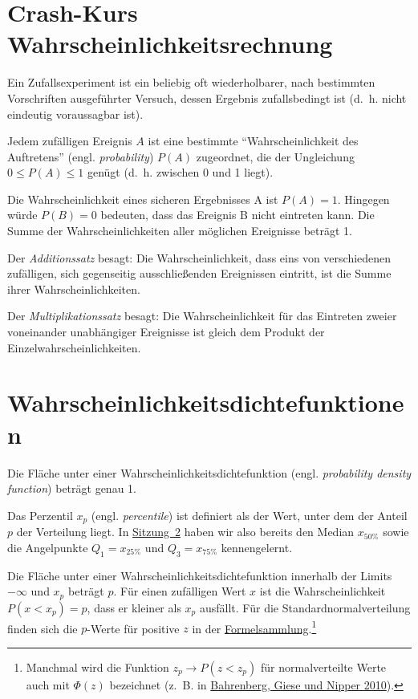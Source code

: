 \documentclass[
  11pt,
  ngerman,
  a4paper,
]{report}
\begin{document}
\hypertarget{crash-kurs-wahrscheinlichkeitsrechnung}{%
\section{Crash-Kurs Wahrscheinlichkeitsrechnung}\label{crash-kurs-wahrscheinlichkeitsrechnung}}

Ein Zufallsexperiment ist ein beliebig oft wiederholbarer, nach bestimmten Vorschriften ausgeführter Versuch, dessen Ergebnis zufallsbedingt ist (d.~h. nicht eindeutig voraussagbar ist).

Jedem zufälligen Ereignis \(A\) ist eine bestimmte \enquote{Wahrscheinlichkeit des Auftretens} (engl. \emph{probability}) \(P(A)\) zugeordnet, die der Ungleichung \(0 \leq P(A) \leq 1\) genügt (d.~h. zwischen 0 und 1 liegt).

Die Wahrscheinlichkeit eines sicheren Ergebnisses A ist \(P(A) = 1\). Hingegen würde \(P(B) = 0\) bedeuten, dass das Ereignis B nicht eintreten kann. Die Summe der Wahrscheinlichkeiten aller möglichen Ereignisse beträgt 1.

Der \emph{Additionssatz} besagt: Die Wahrscheinlichkeit, dass eins von verschiedenen zufälligen, sich gegenseitig ausschließenden Ereignissen eintritt, ist die Summe ihrer Wahrscheinlichkeiten.

Der \emph{Multiplikationssatz} besagt: Die Wahrscheinlichkeit für das Eintreten zweier voneinander unabhängiger Ereignisse ist gleich dem Produkt der Einzelwahrscheinlichkeiten.

\hypertarget{wahrscheinlichkeitsdichtefunktionen}{%
\section{Wahrscheinlichkeitsdichtefunktionen}\label{wahrscheinlichkeitsdichtefunktionen}}

Die Fläche unter einer Wahrscheinlichkeitsdichtefunktion (engl. \emph{probability density function}) beträgt genau 1.

Das Perzentil \(x_p\) (engl. \emph{percentile}) ist definiert als der Wert, unter dem der Anteil \(p\) der Verteilung liegt. In \protect\hyperlink{Mauxdfzahlen}{Sitzung~2} haben wir also bereits den Median \(x_{50\%}\) sowie die Angelpunkte \(Q_1=x_{25\%}\) und \(Q_3=x_{75\%}\) kennengelernt.

Die Fläche unter einer Wahrscheinlichkeitsdichtefunktion innerhalb der Limits \(-\infty\) und \(x_p\) beträgt \(p\). Für einen zufälligen Wert \(x\) ist die Wahrscheinlichkeit \(P(x < x_p) = p\), dass er kleiner als \(x_p\) ausfällt.
Für die Standardnormalverteilung finden sich die \(p\)-Werte für positive \(z\) in der \href{Formelsammlung\%20und\%20Wertetabellen.pdf}{Formelsammlung}.\footnote{Manchmal wird die Funktion \(z_p \rightarrow P(z < z_p)\) für normalverteilte Werte auch mit \(\Phi(z)\) bezeichnet (z.~B. in \protect\hyperlink{ref-bahrenberg}{Bahrenberg, Giese und Nipper 2010}).}
\end{document}
